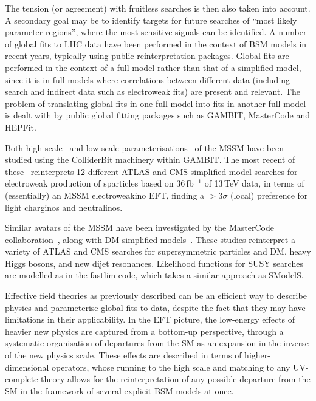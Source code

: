 \documentclass[a4paper,aps,prd,longbibliography,notitlepage,showpacs,amsmath,amssymb,superscriptaddress,nofootinbib,floatfix,11pt,preprintnumbers]{revtex4-1-mod}
\newcommand{\gambit}{\textsf{GAMBIT}\xspace}
\newcommand{\colliderbit}{\textsf{ColliderBit}\xspace}
\newcommand{\smodels}{\textsf{SModelS}\xspace}
\newcommand{\mastercode}{\textsf{MasterCode}\xspace}
\newcommand{\hepfit}{\textsf{HEPFit}\xspace}
\newcommand{\fastlim}{\textsf{fastlim}\xspace}
\begin{document}
The tension (or agreement) with fruitless searches is then also taken into account. A secondary goal may be to identify targets for future searches of ``most likely parameter regions'', where the most sensitive signals can be identified.
A number of global fits to LHC data have been performed in the context of BSM models in recent years, typically using public reinterpretation packages. Global fits are performed in the context of a full model rather than that of a simplified model, since it is in full models where correlations between different data (including search and indirect data such as electroweak fits) are present and relevant.  The problem of translating global fits in one full model into fits in another full model is dealt with by public global fitting packages such as \gambit \cite{gambit,grev}, \mastercode \cite{Bagnaschi:2017tru,Costa:2017gup,Bagnaschi:2019djj} and \hepfit \cite{deBlas:2019okz}.

Both high-scale~\cite{GAMBIT:GUT} and low-scale parameterisations~\cite{GAMBIT:MSSM7, GAMBIT:EWMSSM} of the MSSM have been studied using the \colliderbit machinery within \gambit.  The most recent of these~\cite{GAMBIT:EWMSSM} reinterprets 12 different ATLAS and CMS simplified model searches for electroweak production of sparticles based on 36\,fb$^{-1}$ of 13\,TeV data, in terms of (essentially) an MSSM electroweakino EFT, finding a $>3\sigma$ (local) preference for light charginos and neutralinos.

Similar avatars of the MSSM have been investigated by the \mastercode collaboration~\cite{Bagnaschi:2017tru,Costa:2017gup}, along with DM simplified models~\cite{Bagnaschi:2019djj}. These studies reinterpret a variety of ATLAS and CMS searches for supersymmetric particles and DM, heavy Higgs bosons, and new dijet resonances. Likelihood functions for SUSY searches are modelled as in the \fastlim code, %
which takes a similar approach as \smodels.

Effective field theories as previously described can be an efficient way to describe physics and parameterise global fits to data, despite the fact that they may have limitations in their applicability.
In the EFT picture, the low-energy effects of heavier new physics are captured from a bottom-up perspective, through a systematic organisation of %
departures from the SM as an expansion in the
inverse of the new physics scale. These effects are described
in terms of higher-dimensional operators, whose running to the high scale and
matching to any UV-complete theory allows for the reinterpretation of any
possible departure from the SM in the framework of several explicit BSM models
at once.
\end{document}
